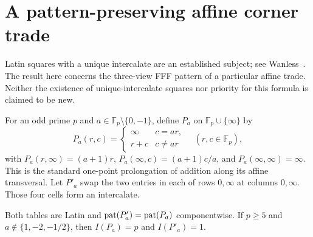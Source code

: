 \section{A pattern-preserving affine corner trade}
\label{sec:corner-trade}

Latin squares with a unique intercalate are an established subject;
see Wanless~\cite{Wanless2001Unique}. The result here concerns the
three-view FFF pattern of a particular affine trade. Neither the
existence of unique-intercalate squares nor priority for this formula
is claimed to be new.

For an odd prime $p$ and $a\in\mathbb F_p\setminus\{0,-1\}$, define
$P_a$ on $\mathbb F_p\cup\{\infty\}$ by
\[
 P_a(r,c)=\begin{cases}\infty&c=ar,\\r+c&c\ne ar\end{cases}
 \quad(r,c\in\mathbb F_p),
\]
with $P_a(r,\infty)=(a+1)r$, $P_a(\infty,c)=(a+1)c/a$, and
$P_a(\infty,\infty)=\infty$. This is the standard one-point
prolongation of addition along its affine transversal. Let $P'_a$
swap the two entries in each of rows $0,\infty$ at columns $0,\infty$.
Those four cells form an intercalate.

\begin{theorem}
\label{thm:corner-trade}
Both tables are Latin and $\operatorname{pat}(P'_a)=\operatorname{pat}(P_a)$ componentwise.
If $p\geq5$ and $a\notin\{1,-2,-1/2\}$, then
$I(P_a)=p$ and $I(P'_a)=1$.
\end{theorem}

